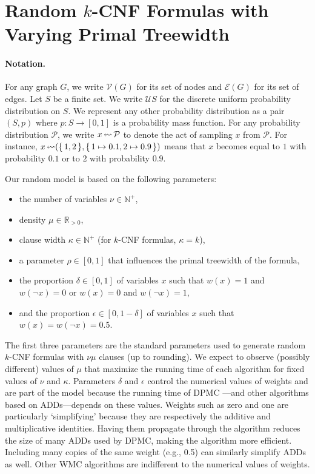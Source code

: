 \section{Random $k$-CNF Formulas with Varying Primal
  Treewidth}\label{sec:model}

\paragraph*{Notation.}
For any graph $G$, we write $\mathcal{V}(G)$ for its set of nodes and
$\mathcal{E}(G)$ for its set of edges. Let $S$ be a finite set. We write
$\mathcal{U}S$ for the discrete uniform probability distribution on $S$. We
represent any other probability distribution as a pair $(S, p)$ where $p\colon S
\to [0, 1]$ is a probability mass function. For any probability distribution
$\mathcal{P}$, we write $x \leftlsquigarrow \mathcal{P}$ to denote the act of
sampling $x$ from $\mathcal{P}$. For instance, $x \leftlsquigarrow (\{\, 1, 2 \,\}, \{\, 1 \mapsto 0.1, 2 \mapsto 0.9 \,\})$ means that $x$ becomes equal to $1$ with probability $0.1$ or to $2$ with probability $0.9$.

Our random model is based on the following parameters:
\begin{itemize}
\item the number of variables $\nu \in \mathbb{N}^+$,
\item density $\mu \in \mathbb{R}_{>0}$,
\item clause width $\kappa \in \mathbb{N}^+$ (for $k$-CNF formulas, $\kappa =
  k$),
\item a parameter $\rho \in [0, 1]$ that influences the primal treewidth of
  the formula,
\item the proportion $\delta \in [0, 1]$ of variables $x$ such that $w(x) = 1$
  and $w(\neg x) = 0$ or $w(x) = 0$ and $w(\neg x) = 1$,
\item and the proportion $\epsilon \in [0, 1-\delta]$ of variables $x$ such that
  $w(x) = w(\neg x) = 0.5$.
\end{itemize}
The first three parameters are the standard parameters used to generate random
$k$-CNF formulas with $\nu\mu$ clauses (up to rounding). We expect to observe
(possibly different) values of $\mu$ that maximize the running time of each
algorithm for fixed values of $\nu$ and $\kappa$. Parameters $\delta$ and
$\epsilon$ control the numerical values of weights and are part of the model
because the running time of \textsc{DPMC} \citep{DBLP:conf/cp/DudekPV20}---and
other algorithms based on ADDs---depends on these values. Weights such as zero
and one are particularly `simplifying' because they are respectively the
additive and multiplicative identities. Having them propagate through the
algorithm reduces the size of many ADDs used by \textsc{DPMC}, making the
algorithm more efficient. Including many copies of the same weight (e.g., 0.5)
can similarly simplify ADDs as well. Other WMC algorithms are indifferent to the
numerical values of weights.

